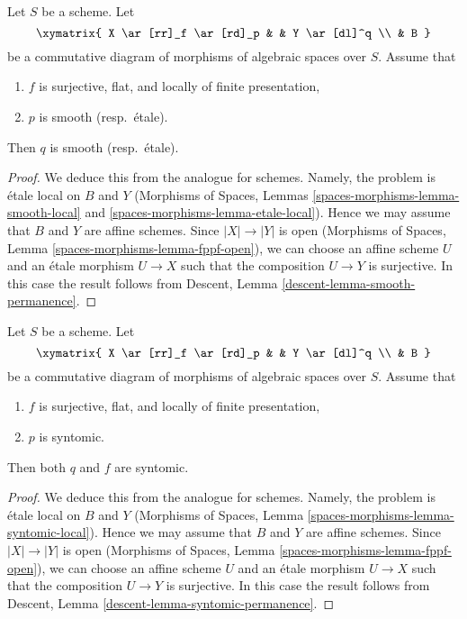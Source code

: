 \begin{lemma}
\label{lemma-smooth-permanence}
Let $S$ be a scheme. Let
$$
\xymatrix{
X \ar[rr]_f \ar[rd]_p & &
Y \ar[dl]^q \\
& B
}
$$
be a commutative diagram of morphisms of algebraic spaces over $S$. Assume that
\begin{enumerate}
\item $f$ is surjective, flat, and locally of finite presentation,
\item $p$ is smooth (resp.\ \'etale).
\end{enumerate}
Then $q$ is smooth (resp.\ \'etale).
\end{lemma}

\begin{proof}
We deduce this from the analogue for schemes.
Namely, the problem is \'etale local on $B$ and $Y$
(Morphisms of Spaces, Lemmas
\ref{spaces-morphisms-lemma-smooth-local} and
\ref{spaces-morphisms-lemma-etale-local}).
Hence we may assume that $B$ and $Y$ are affine
schemes. Since $|X| \to |Y|$ is open
(Morphisms of Spaces, Lemma \ref{spaces-morphisms-lemma-fppf-open}),
we can choose an affine
scheme $U$ and an \'etale morphism $U \to X$ such that the
composition $U \to Y$ is surjective. In this case the result
follows from Descent, Lemma
\ref{descent-lemma-smooth-permanence}.
\end{proof}

\begin{lemma}
\label{lemma-syntomic-permanence}
Let $S$ be a scheme. Let
$$
\xymatrix{
X \ar[rr]_f \ar[rd]_p & &
Y \ar[dl]^q \\
& B
}
$$
be a commutative diagram of morphisms of algebraic spaces over $S$. Assume that
\begin{enumerate}
\item $f$ is surjective, flat, and locally of finite presentation,
\item $p$ is syntomic.
\end{enumerate}
Then both $q$ and $f$ are syntomic.
\end{lemma}

\begin{proof}
We deduce this from the analogue for schemes.
Namely, the problem is \'etale local on $B$ and $Y$
(Morphisms of Spaces, Lemma
\ref{spaces-morphisms-lemma-syntomic-local}).
Hence we may assume that $B$ and $Y$ are affine
schemes. Since $|X| \to |Y|$ is open
(Morphisms of Spaces, Lemma \ref{spaces-morphisms-lemma-fppf-open}),
we can choose an affine
scheme $U$ and an \'etale morphism $U \to X$ such that the
composition $U \to Y$ is surjective. In this case the result
follows from Descent, Lemma
\ref{descent-lemma-syntomic-permanence}.
\end{proof}











